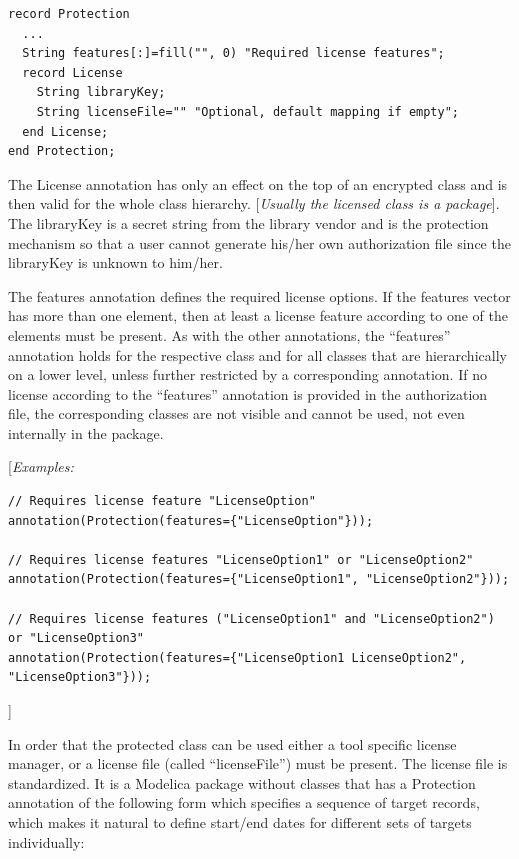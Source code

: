 \documentclass[10pt,a4paper]{report}
\begin{document}
\begin{lstlisting}[language=modelica]
record Protection
  ...
  String features[:]=fill("", 0) "Required license features";
  record License
    String libraryKey;
    String licenseFile="" "Optional, default mapping if empty";
  end License;
end Protection;
\end{lstlisting}
The License annotation has only an effect on the top of an encrypted
class and is then valid for the whole class hierarchy. {[}\emph{Usually
the licensed class is a package}{]}. The libraryKey is a secret string
from the library vendor and is the protection mechanism so that a user
cannot generate his/her own authorization file since the libraryKey is
unknown to him/her.

The features annotation defines the required license options. If the
features vector has more than one element, then at least a license
feature according to one of the elements must be present. As with the
other annotations, the ``features'' annotation holds for the respective
class and for all classes that are hierarchically on a lower level,
unless further restricted by a corresponding annotation. If no license
according to the ``features'' annotation is provided in the
authorization file, the corresponding classes are not visible and cannot
be used, not even internally in the package.

{[}\emph{Examples:}
\begin{lstlisting}[language=modelica]
// Requires license feature "LicenseOption" 
annotation(Protection(features={"LicenseOption"})); 
 
// Requires license features "LicenseOption1" or "LicenseOption2" 
annotation(Protection(features={"LicenseOption1", "LicenseOption2"})); 
 
// Requires license features ("LicenseOption1" and "LicenseOption2") or "LicenseOption3"
annotation(Protection(features={"LicenseOption1 LicenseOption2", "LicenseOption3"})); 
\end{lstlisting}

{]}

In order that the protected class can be used either a tool specific
license manager, or a license file (called ``licenseFile'') must be
present. The license file is standardized. It is a Modelica package
without classes that has a Protection annotation of the following form
which specifies a sequence of target records, which makes it natural to
define start/end dates for different sets of targets individually:
\end{document}
